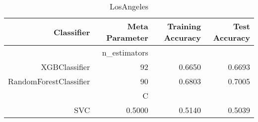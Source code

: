 
\begin{table}[H]
    \caption{LosAngeles}
    \centering
    \begin{tabular}{|r|r|r|r|}
        \hline
        Classifier &Meta Parameter &Training Accuracy
        &Test Accuracy\\
        \hline
        &n\_estimators &\multicolumn{2}{|r|}{}\\
        \hline
        XGBClassifier &92 &0.6650 &0.6693\\
        \hline
        RandomForestClassifier &90 &0.6803 &0.7005\\
        \hline
        &C &\multicolumn{2}{|r|}{}\\
        \hline
        SVC &0.5000 &0.5140 &0.5039\\
        \hline
    \end{tabular}
\end{table}
